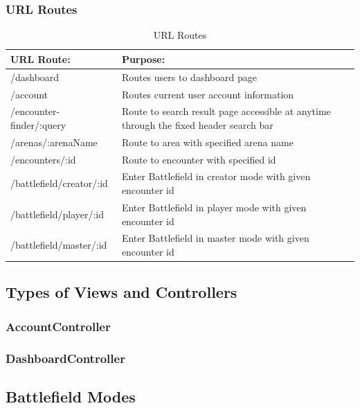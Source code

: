 \documentclass[12pt,a4paper]{report}
\begin{document}
		\subsubsection { URL Routes}
		
			\begin{table}[H]
				\begin{center}
					\begin{tabular}{ |p{5cm}|p{7cm}|| } 
						\hline
						URL Route: & Purpose: \\
						\hline
						/dashboard & Routes users to dashboard page \\
						/account & Routes current user account information\\
						/encounter-finder/:query & Route to search result page accessible at anytime through the fixed header search bar  \\
						/arenas/:arenaName & Route to area with specified arena name  \\
						/encounters/:id & Route to encounter with specified id \\
						/battlefield/creator/:id & Enter Battlefield in creator mode with given encounter id \\
						/battlefield/player/:id & Enter Battlefield in player mode with given encounter id \\
						/battlefield/master/:id & Enter Battlefield in master mode with given encounter id \\	
						\hline
					\end{tabular}
				\end{center}
			\caption{URL Routes} \label{table: URL Routes}
		\end{table}
		
		
	\subsection{Types of Views and Controllers}
		\subsubsection{AccountController}
		\subsubsection{DashboardController}
	
		
	
	\subsection{Battlefield Modes}
\end{document}
